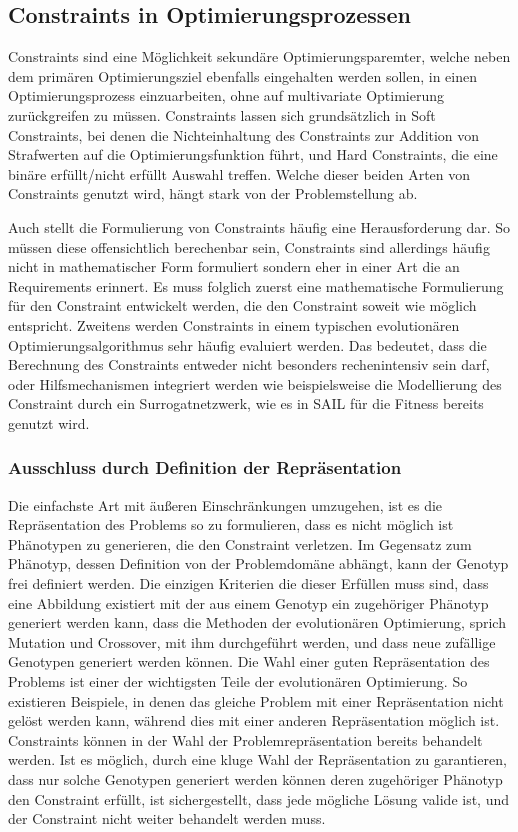 \subsection{Constraints in Optimierungsprozessen}
Constraints sind eine Möglichkeit sekundäre Optimierungsparemter, welche neben dem primären Optimierungsziel ebenfalls eingehalten werden sollen, in einen Optimierungsprozess einzuarbeiten, ohne auf multivariate Optimierung zurückgreifen zu müssen.
Constraints lassen sich grundsätzlich in Soft Constraints, bei denen die Nichteinhaltung des Constraints zur Addition von Strafwerten auf die Optimierungsfunktion führt, und Hard Constraints, die eine binäre erfüllt/nicht erfüllt Auswahl treffen.
Welche dieser beiden Arten von Constraints genutzt wird, hängt stark von der Problemstellung ab.

Auch stellt die Formulierung von Constraints häufig eine Herausforderung dar.
So müssen diese offensichtlich berechenbar sein, Constraints sind allerdings häufig nicht in mathematischer Form formuliert sondern eher in einer Art die an Requirements erinnert.
Es muss folglich zuerst eine mathematische Formulierung für den Constraint entwickelt werden, die den Constraint soweit wie möglich entspricht.
Zweitens werden Constraints in einem typischen evolutionären Optimierungsalgorithmus sehr häufig evaluiert werden. Das bedeutet, dass die Berechnung des Constraints entweder nicht besonders rechenintensiv sein darf, oder Hilfsmechanismen integriert werden wie beispielsweise die Modellierung des Constraint durch ein Surrogatnetzwerk, wie es in SAIL für die Fitness bereits genutzt wird.

\subsubsection{Ausschluss durch Definition der Repräsentation}

Die einfachste Art mit äußeren Einschränkungen umzugehen, ist es die Repräsentation des Problems so zu formulieren, dass es nicht möglich ist Phänotypen zu generieren, die den Constraint verletzen.
Im Gegensatz zum Phänotyp, dessen Definition von der Problemdomäne abhängt, kann der Genotyp frei definiert werden.
Die einzigen Kriterien die dieser Erfüllen muss sind, dass eine Abbildung existiert mit der aus einem Genotyp ein zugehöriger Phänotyp generiert werden kann, dass die Methoden der evolutionären Optimierung, sprich Mutation und Crossover, mit ihm durchgeführt werden, und dass neue zufällige Genotypen generiert werden können.
Die Wahl einer guten Repräsentation des Problems ist einer der wichtigsten Teile der evolutionären Optimierung.
So existieren Beispiele, in denen das gleiche Problem mit einer Repräsentation nicht gelöst werden kann, während dies mit einer anderen Repräsentation möglich ist.
Constraints können in der Wahl der Problemrepräsentation bereits behandelt werden.
Ist es möglich, durch eine kluge Wahl der Repräsentation zu garantieren, dass nur solche Genotypen generiert werden können deren zugehöriger Phänotyp den Constraint erfüllt, ist sichergestellt, dass jede mögliche Lösung valide ist, und der Constraint nicht weiter behandelt werden muss.

